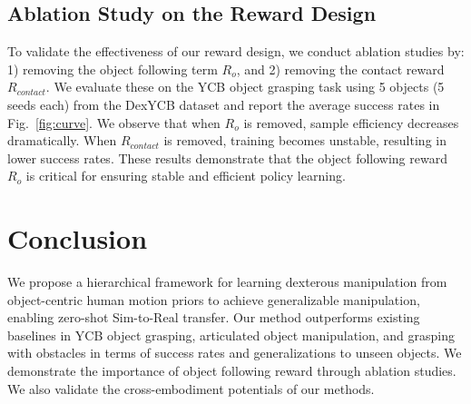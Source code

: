 \documentclass[letterpaper]{article}
\begin{document}
\subsection{Ablation Study on the Reward Design}
To validate the effectiveness of our reward design, we conduct ablation studies by: 1) removing the object following term $R_{o}$, and 2) removing the contact reward $R_{contact}$. We evaluate these on the YCB object grasping task using 5 objects (5 seeds each) from the DexYCB dataset and report the average success rates in Fig.~\ref{fig:curve}. We observe that when $R_{o}$ is removed, sample efficiency decreases dramatically. When $R_{contact}$ is removed, training becomes unstable, resulting in lower success rates. These results demonstrate that the object following reward $R_{o}$ is critical for ensuring stable and efficient policy learning.

\section{Conclusion}
We propose a hierarchical framework for learning dexterous manipulation from object-centric human motion priors to achieve generalizable manipulation, enabling zero-shot Sim-to-Real transfer. Our method outperforms existing baselines in YCB object grasping, articulated object manipulation, and grasping with obstacles in terms of success rates and generalizations to unseen objects. We demonstrate the importance of object following reward through ablation studies. We also validate the cross-embodiment potentials of our methods.


\end{document}
